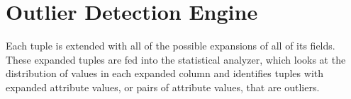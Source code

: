 \section{Outlier Detection Engine}
\label{sec:implementation}
Each tuple is extended with all of the possible expansions of all of its fields.
These expanded tuples are fed into the statistical analyzer, which looks at the distribution of values in each expanded column and identifies tuples with expanded attribute values, or pairs of attribute values, that are outliers.


%



